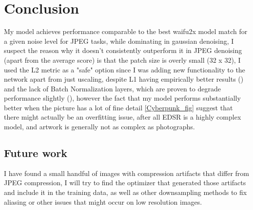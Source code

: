 \chapter{Conclusion} %

\label{Chapter6}

My model achieves performance comparable to the best waifu2x model match for a given noise level for JPEG tasks, while dominating in gaussian denoising, I suspect the reason why it doesn't consistently outperform it in JPEG denoising (apart from the average score) is that the patch size is overly small (32 x 32), I used the L2 metric as a "safe" option since I was adding new functionality to the network apart from just uscaling, despite L1 having empirically better results (\cite{EDSR}) and the lack of Batch Normalization layers, which are proven to degrade performance slightly (\cite{DnCNN}), however the fact that my model performs substantially better when the picture has a lot of fine detail \ref{Cyberpunk_fig} suggest that there might actually be an overfitting issue, after all EDSR is a highly complex model, and artwork is generally not as complex as photographs.

\section{Future work}

I have found a small handful of images with compression artifacts that differ from JPEG compression, I will try to find the optimizer that generated those artifacts and include it in the training data, as well as other downsampling methods to fix aliasing or other issues that might occur on low resolution images.